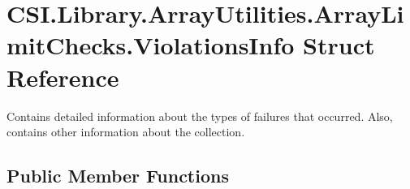 \hypertarget{struct_c_s_i_1_1_library_1_1_array_utilities_1_1_array_limit_checks_1_1_violations_info}{}\section{C\+S\+I.\+Library.\+Array\+Utilities.\+Array\+Limit\+Checks.\+Violations\+Info Struct Reference}
\label{struct_c_s_i_1_1_library_1_1_array_utilities_1_1_array_limit_checks_1_1_violations_info}


Contains detailed information about the types of failures that occurred. Also, contains other information about the collection.  


\subsection*{Public Member Functions}
